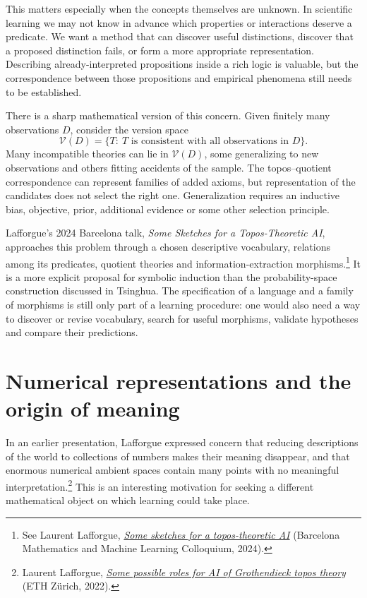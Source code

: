 This matters especially when the concepts themselves are unknown. In scientific learning we may not know in advance which properties or interactions deserve a predicate. We want a method that can discover useful distinctions, discover that a proposed distinction fails, or form a more appropriate representation. Describing already-interpreted propositions inside a rich logic is valuable, but the correspondence between those propositions and empirical phenomena still needs to be established.

There is a sharp mathematical version of this concern. Given finitely many observations \(D\), consider the version space
\[
 \mathcal V(D)=\{T:\ T\text{ is consistent with all observations in }D\}.
\]
Many incompatible theories can lie in \(\mathcal V(D)\), some generalizing to new observations and others fitting accidents of the sample. The topos--quotient correspondence can represent families of added axioms, but representation of the candidates does not select the right one. Generalization requires an inductive bias, objective, prior, additional evidence or some other selection principle.

Lafforgue's 2024 Barcelona talk, \emph{Some Sketches for a Topos-Theoretic AI}, approaches this problem through a chosen descriptive vocabulary, relations among its predicates, quotient theories and information-extraction morphisms.\footnote{See Laurent Lafforgue, \href{https://www.laurentlafforgue.org/Expose_Lafforgue_IA_Barcelone_fevrier_2024.pdf}{\emph{Some sketches for a topos-theoretic AI}} (Barcelona Mathematics and Machine Learning Colloquium, 2024).} It is a more explicit proposal for symbolic induction than the probability-space construction discussed in Tsinghua. The specification of a language and a family of morphisms is still only part of a learning procedure: one would also need a way to discover or revise vocabulary, search for useful morphisms, validate hypotheses and compare their predictions.

\section{Numerical representations and the origin of meaning}

In an earlier presentation, Lafforgue expressed concern that reducing descriptions of the world to collections of numbers makes their meaning disappear, and that enormous numerical ambient spaces contain many points with no meaningful interpretation.\footnote{Laurent Lafforgue, \href{https://www.laurentlafforgue.org/~lafforgue/Expose_Lafforgue_topos_AI_ETH_sept_2022.pdf}{\emph{Some possible roles for AI of Grothendieck topos theory}} (ETH Z\"urich, 2022).} This is an interesting motivation for seeking a different mathematical object on which learning could take place.

